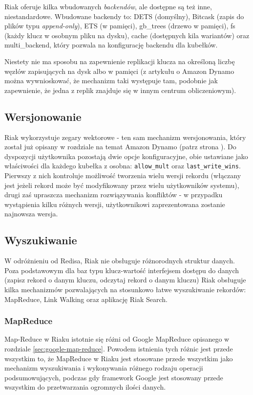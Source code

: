 Riak oferuje kilka wbudowanych \emph{backendów}, ale dostępne są też inne, niestandardowe.
Wbudowane backendy to: DETS (domyślny), Bitcask (zapis do plików typu \emph{append-only}), ETS (w pamięci), gb\_trees (drzewo w pamięci), fs (każdy klucz w osobnym pliku na dysku), cache (dostępnych kila wariantów) oraz multi\_backend, który pozwala na konfigurację backendu dla kubełków. 

Niestety nie ma sposobu na zapewnienie replikacji klucza na określoną liczbę węzłów zapisujących na dysk albo w pamięci (z artykułu o Amazon Dynamo można wywnioskować, że mechanizm taki występuje tam, podobnie jak zapewnienie, że jedna z replik znajduje się w innym centrum obliczeniowym).

\subsection*{Wersjonowanie}

Riak wykorzystuje zegary wektorowe - ten sam mechanizm wersjonowania, który został już opisany w rozdziale na temat Amazon Dynamo (patrz strona \pageref{sec:dynamo-vector-clocks}).
Do dyspozycji użytkownika pozostają dwie opcje konfiguracyjne, obie ustawiane jako właściwości dla każdego kubełka z osobna: \verb+allow_mult+ oraz \verb+last_write_wins+.
Pierwszy z nich kontroluje możliwość tworzenia wielu wersji rekordu (włączany jest jeżeli rekord może być modyfikowany przez wielu użytkowników systemu), drugi zaś upraszcza mechanizm rozwiązywania konfliktów - w przypadku wystąpienia kilku różnych wersji, użytkownikowi zaprezentowana zostanie najnowsza wersja.

\subsection*{Wyszukiwanie}

W odróżnieniu od Redisa, Riak nie obsługuje różnorodnych struktur danych.
Poza podstawowym dla baz typu klucz-wartość interfejsem dostępu do danych (zapisz rekord o danym kluczu, odczytaj rekord o danym kluczu) Riak obsługuje kilka mechanizmów pozwalających na stosunkowo łatwe wyszukiwanie rekordów: MapReduce, Link Walking oraz aplikację Riak Search.

\subsubsection*{MapReduce}

Map-Reduce w Riaku istotnie się różni od Google MapReduce opisanego w rozdziale \ref{sec:google-map-reduce}.
Powodem istnienia tych różnic jest przede wszystkim to, że MapReduce w Riaku jest stosowane przede wszystkim jako mechanizm wyszukiwania i wykonywania różnego rodzaju operacji podsumowujących, podczas gdy framework Google jest stosowany przede wszystkim do przetwarzania ogromnych ilości danych.

